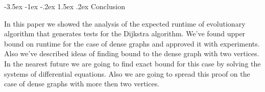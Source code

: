\documentclass[a4paper,10pt]{article}
\makeatletter
\theoremstyle{definition}
\renewcommand\section{\@startsection {section}{1}{\z@}%
                                   {-3.5ex \@plus -1ex \@minus -.2ex}%
                                   {1.5ex \@plus.2ex}%
                                   {\large\bfseries}}
\makeatother
\begin{document}
\section{Conclusion}
\label{sec:6}

In this paper we showed the analysis of the expected runtime of evolutionary algorithm that generates tests for the Dijkstra algorithm. We've found upper bound on runtime for the case of dense graphs and approved it with experiments. Also we've described ideas of finding bound to the dense graph with two vertices. In the nearest future we are going to find exact bound for this case by solving the systems of differential equations. Also we are going to spread this proof on the case of dense graphs with more then two vertices.
\end{document}
